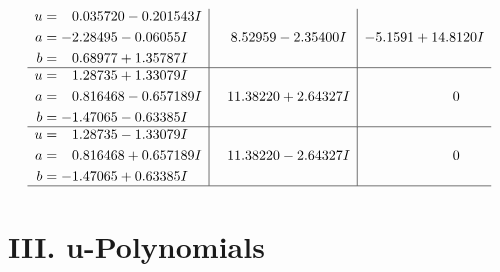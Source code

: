 \documentclass[1p]{elsarticle_modified}
\theoremstyle{definition}
\begin{document}
$$\begin{array}{c|c|c}
\begin{aligned}
u &= \phantom{-}0.035720 - 0.201543 I \\
a &= -2.28495 - 0.06055 I \\
b &= \phantom{-}0.68977 + 1.35787 I\end{aligned}
 & \phantom{-}8.52959 - 2.35400 I & -5.1591 + 14.8120 I \\ \hline\begin{aligned}
u &= \phantom{-}1.28735 + 1.33079 I \\
a &= \phantom{-}0.816468 - 0.657189 I \\
b &= -1.47065 - 0.63385 I\end{aligned}
 & \phantom{-}11.38220 + 2.64327 I & \phantom{-0.000000 } 0 \\ \hline\begin{aligned}
u &= \phantom{-}1.28735 - 1.33079 I \\
a &= \phantom{-}0.816468 + 0.657189 I \\
b &= -1.47065 + 0.63385 I\end{aligned}
 & \phantom{-}11.38220 - 2.64327 I & \phantom{-0.000000 } 0\\
 \hline 
 \end{array}$$\newpage
\newpage\renewcommand{\arraystretch}{1}
\centering \section*{ III. u-Polynomials}
\end{document}

